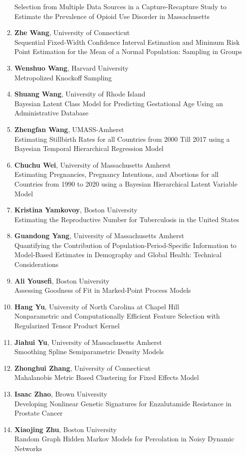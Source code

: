 \begin{enumerate}
Selection from Multiple Data Sources in a Capture-Recapture Study to Estimate the Prevalence of Opioid Use Disorder in Massachusetts
\item \textbf{Zhe Wang}, University of Connecticut \\
Sequential Fixed-Width Confidence Interval Estimation and Minimum Risk Point Estimation for the Mean of a Normal Population: Sampling in Groups
\item \textbf{Wenshuo Wang}, Harvard University \\
Metropolized Knockoff Sampling
\item \textbf{Shuang Wang}, University of Rhode Island \\
Bayesian Latent Class Model for Predicting Gestational Age Using an Administrative Database
\item \textbf{Zhengfan Wang}, UMASS-Amherst \\
Estimating Stillbirth Rates for all Countries from 2000 Till 2017 using a Bayesian Temporal Hierarchical Regression Model
\item \textbf{Chuchu Wei}, University of Massachusetts Amherst \\
Estimating Pregnancies, Pregnancy Intentions, and Abortions for all Countries from 1990 to 2020 using a Bayesian Hierarchical Latent Variable Model
\item \textbf{Kristina Yamkovoy}, Boston University \\
Estimating the Reproductive Number for Tuberculosis in the United States
\item \textbf{Guandong Yang}, University of Massachusetts Amherst \\
Quantifying the Contribution of Population-Period-Specific Information to Model-Based Estimates in Demography and Global Health: Technical Considerations
\item \textbf{Ali Yousefi}, Boston University \\
Assessing Goodness of Fit in Marked-Point Process Models
\item \textbf{Hang Yu}, University of North Carolina at Chapel Hill \\
Nonparametric and Computationally Efficient Feature Selection with Regularized Tensor Product Kernel
\item \textbf{Jiahui Yu}, University of Massachusetts Amherst \\
Smoothing Spline Semiparametric Density Models
\item \textbf{Zhonghui Zhang}, University of Connecticut \\
Mahalanobis Metric Based Clustering for Fixed Effects Model
\item \textbf{Isaac Zhao}, Brown University \\
Developing Nonlinear Genetic Signatures for Enzalutamide Resistance in Prostate Cancer
\item \textbf{Xiaojing Zhu}, Boston University \\
Random Graph Hidden Markov Models for Percolation in Noisy Dynamic Networks
\end{enumerate}

